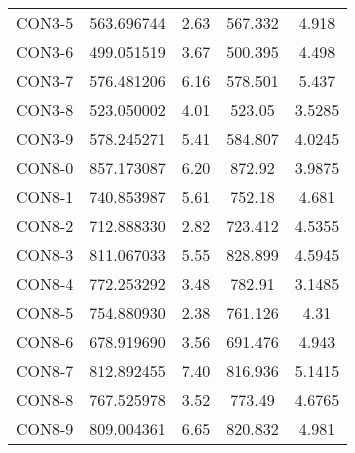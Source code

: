 \begin{table}[ht]
\begin{tabular}{c c c c c}
CON3-5 & 563.696744 & 2.63 & 567.332 & 4.918 \\
CON3-6 & 499.051519 & 3.67 & 500.395 & 4.498 \\
CON3-7 & 576.481206 & 6.16 & 578.501 & 5.437 \\
CON3-8 & 523.050002 & 4.01 & 523.05 & 3.5285 \\
CON3-9 & 578.245271 & 5.41 & 584.807 & 4.0245 \\
CON8-0 & 857.173087 & 6.20 & 872.92 & 3.9875 \\
CON8-1 & 740.853987 & 5.61 & 752.18 & 4.681 \\
CON8-2 & 712.888330 & 2.82 & 723.412 & 4.5355 \\
CON8-3 & 811.067033 & 5.55 & 828.899 & 4.5945 \\
CON8-4 & 772.253292 & 3.48 & 782.91 & 3.1485 \\
CON8-5 & 754.880930 & 2.38 & 761.126 & 4.31 \\
CON8-6 & 678.919690 & 3.56 & 691.476 & 4.943 \\
CON8-7 & 812.892455 & 7.40 & 816.936 & 5.1415 \\
CON8-8 & 767.525978 & 3.52 & 773.49 & 4.6765 \\
CON8-9 & 809.004361 & 6.65 & 820.832 & 4.981 \\
[1ex]\hline
\end{tabular}
\label{table:nonlin}
\end{table} \clearpage
